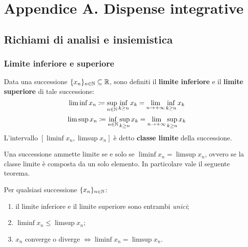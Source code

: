 \clearpage

\section*{Appendice A. Dispense integrative} \label{appendice-combinatorio}
\addtocounter{section}{1}
\setcounter{subsection}{0}
\setcounter{teo}{0}
\subsection{Richiami di analisi e insiemistica}\label{analisi-insiemistica}

\subsubsection{Limite inferiore e superiore}

\begin{defn}
	Data una successione $\{x_n\}_{n \in \mathbb N} \subseteq \mathbb R$, sono definiti il \textbf{limite inferiore} e il \textbf{limite superiore} di tale successione:
	$$ \liminf x_n \coloneqq \sup_{n \in \mathbb N} \inf_{k \ge n} x_k = \lim_{n \to +\infty} \inf_{k \ge n} x_k $$
	$$ \limsup x_n \coloneqq \inf_{n \in \mathbb N} \sup_{k \ge n} x_k = \lim_{n \to +\infty} \sup_{k \ge n} x_k$$
	L'intervallo $[\liminf x_n , \limsup x_n]$ è detto \textbf{classe limite} della successione.
\end{defn}
Una successione ammette limite se e solo se $\liminf x_n = \limsup x_n$, ovvero se la classe limite è composta da un solo elemento.
In particolare vale il seguente teorema.

\begin{teo}
	Per qualsiasi successione $\{x_n\}_{n \in \mathbb N}$:
	\begin{enumerate}
		\item il limite inferiore e il limite superiore sono entrambi \emph{unici};
		\item $ \liminf x_n \le \limsup x_n$;
		\item $x_n$ converge o diverge $\iff \liminf x_n = \limsup x_n$.
	\end{enumerate}
\end{teo}

